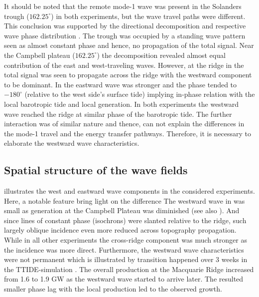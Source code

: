 \documentclass[12pt]{article}
\begin{document}
It should be noted that the remote mode-1 wave was present in the Solanders trough 
($162.25^{\circ}$) in both experiments, but the wave travel paths were different. This conclusion 
was supported by the directional decomposition and respective 
wave phase distribution . The trough was occupied 
by a standing wave pattern seen as almost constant phase and hence, no propagation of the total 
signal. 
Near the Campbell plateau ($162.25^{\circ}$) the decomposition revealed almost equal contribution 
of the east and west-traveling waves. However, at the ridge in  the total signal was 
seen to propagate across the ridge with the westward component to be dominant. In  
the eastward wave was stronger and the phase tended to $-180^{\circ}$ (relative to the west side's 
surface tide) implying in-phase relation with the local barotropic tide and local generation. In 
both experiments the westward wave reached the ridge at similar phase of the barotropic tide. 
The further interaction was of similar nature and thence, can not explain the differences 
in the mode-1 travel and the energy transfer pathways. Therefore, it is necessary to elaborate the 
westward wave characteristics.\\


\subsection{Spatial structure of the wave fields}
\label{C3.sec:3d_var}
 illustrates the west and eastward wave components in the considered 
experiments. Here, a notable feature bring light on the difference 
The westward wave in 
 was small as generation at the Campbell Plateau was diminished (see also 
). And since lines of constant phase (isochrons) were slanted relative to the 
ridge, such 
largely oblique incidence even more reduced across topography propagation. While in all other 
experiments the cross-ridge component was much stronger as the incidence was more direct. 
Furthermore, the westward wave characteristics were not permanent which is illustrated 
by 
transition happened over 3 weeks in the TTIDE-simulation . The 
overall 
production at the Macquarie Ridge increased from 1.6 to 1.9 GW  as the 
westward 
wave started to arrive later. The resulted smaller phase lag with the local production led to the 
observed growth.\\
\end{document}
